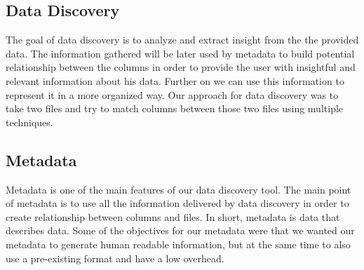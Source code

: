 \subsection{Data Discovery}
The goal of data discovery is to analyze and extract insight from the the provided data. The information gathered will be later used by metadata to build potential relationship between the columns in order to provide the user with insightful and relevant information about his data. Further on we can use this information to represent it in a more organized way. Our approach for data discovery was to take two files and try to match columns between those two files using multiple techniques.

\vspace{5mm} %
\subsection{Metadata}
Metadata is one of the main features of our data discovery tool. The main point of metadata is to use all the information delivered by data discovery in order to create relationship between columns and files. In short, metadata is data that describes data.
\newline
Some of the objectives for our metadata were that we wanted our metadata to generate human readable information, but at the same time to also use a pre-existing format and have a low overhead.
\newline

\clearpage
